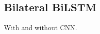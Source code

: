 



\subsection{Bilateral BiLSTM}\label{subsec:method-bilat-bilstm}
With and without CNN.












